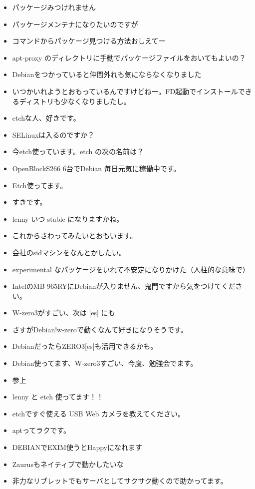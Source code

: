 \documentclass[mingoth,a4paper]{jsarticle}
\begin{document}
\begin{multicols}{2}
 
 \begin{itemize}
    \item パッケージみつけれません
    \item パッケージメンテナになりたいのですが
    \item コマンドからパッケージ見つける方法おしえてー
    \item apt-proxy のディレクトリに手動でパッケージファイルをおいてもよいの？
    \item Debianをつかっていると仲間外れも気にならなくなりました
    \item いつかいれようとおもっているんですけどねー。FD起動でインストールできるディストリも少なくなりましたし。
    \item etchな人、好きです。
    \item SELinuxは入るのですか？
    \item 今etch使っています。etch の次の名前は？
    \item OpenBlockS266 6台でDebian 毎日元気に稼働中です。
    \item Etch使ってます。
    \item すきです。
    \item lenny いつ stable になりますかね。
    \item これからさわってみたいとおもいます。
    \item 会社のsidマシンをなんとかしたい。
    \item experimental なパッケージをいれて不安定になりかけた（人柱的な意味で）
    \item IntelのMB 965RYにDebianが入りません、鬼門ですから気をつけてください。
    \item W-zero3がすごい、次は [es] にも
    \item さすがDebian!w-zeroで動くなんて好きになりそうです。
    \item DebianだったらZERO3[es]も活用できるかも。
    \item Debian使ってます、W-zero3すごい、今度、勉強会でます。
    \item 参上
    \item lenny と etch 使ってます！！
    \item etchですぐ使える USB Web カメラを教えてください。
    \item aptってラクです。
    \item DEBIANでEXIM使うとHappyになれます
    \item Zaurusもネイティブで動かしたいな
    \item 非力なリブレットでもサーバとしてサクサク動くので助かってます。
 \end{itemize}
\end{multicols}
\end{document}
